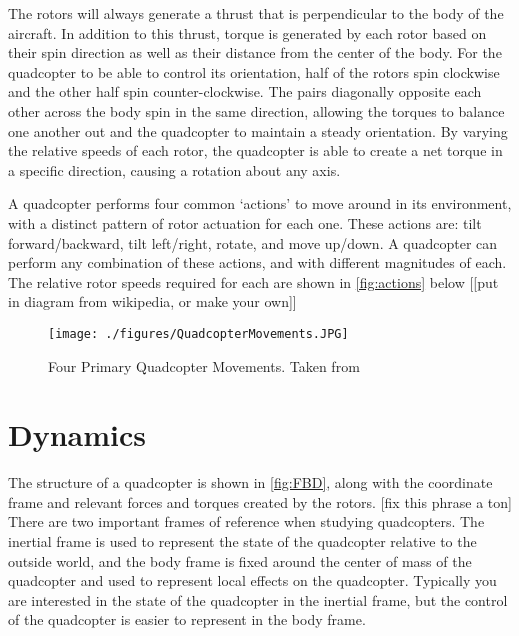 \documentclass[letterpaper,12pt,titlepage,oneside,final]{book}
\begin{document}
The rotors will always generate a thrust that is perpendicular to the body of the aircraft. 
In addition to this thrust, torque is generated by each rotor based on their spin direction  as well as their distance from the center of the body.
For the quadcopter to be able to control its orientation, half of the rotors spin clockwise and the other half spin counter-clockwise. 
The pairs diagonally opposite each other across the body spin in the same direction, allowing the torques to balance one another out and the quadcopter to maintain a steady orientation. 
By varying the relative speeds of each rotor, the quadcopter is able to create a net torque in a specific direction, causing a rotation about any axis.

A quadcopter performs four common ‘actions’ to move around in its environment, with a distinct pattern of rotor actuation for each one. 
These actions are: tilt forward/backward, tilt left/right, rotate, and move up/down. 
A quadcopter can perform any combination of these actions, and with different magnitudes of each. The relative rotor speeds required for each are shown in \autoref{fig:actions} below [[put in diagram from wikipedia, or make your own]]

\begin{figure}
\centering
\texttt{[image: ./figures/QuadcopterMovements.JPG]}
\caption{Four Primary Quadcopter Movements. Taken from \cite{harsha}}
\label{fig:actions}
\end{figure}


\section{Dynamics}


The structure of a quadcopter is shown in \autoref{fig:FBD}, along with the coordinate frame and relevant forces and torques created by the rotors.
[fix this phrase a ton] There are two important frames of reference when studying quadcopters. The inertial frame is used to represent the state of the quadcopter relative to the outside world, and the body frame is fixed around the center of mass of the quadcopter and used to represent local effects on the quadcopter.
Typically you are interested in the state of the quadcopter in the inertial frame, but the control of the quadcopter is easier to represent in the body frame. 
\end{document}
